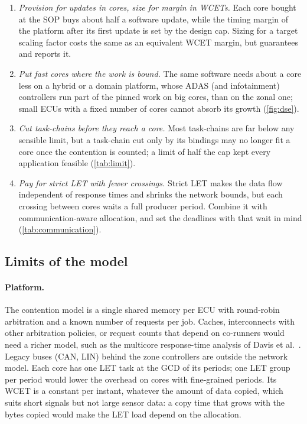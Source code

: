 \begin{enumerate}[label=\textbf{R\arabic*.}, leftmargin=2em]
the cores needed grow with the cores used; a WCET measured in isolation
underestimates the platform by up to half here.
\item \emph{Provision for updates in cores, size for margin in WCETs.}
Each core bought at the SOP buys about half a software update, while the
timing margin of the platform after its first update is set by the design
cap. Sizing for a target scaling factor costs the same as an equivalent
WCET margin, but guarantees and reports it.
\item \emph{Put fast cores where the work is bound.} The same software
needs about a core less on a hybrid or a domain platform, whose ADAS (and
infotainment) controllers run part of the pinned work on big cores, than
on the zonal one; small ECUs with a fixed number of cores cannot absorb
its growth (\cref{fig:dse}).
\item \emph{Cut task-chains before they reach a core.} Most task-chains
are far below any sensible limit, but a task-chain cut only by its
bindings may no longer fit a core once the contention is counted; a limit
of half the cap kept every application feasible (\cref{tab:limit}).
\item \emph{Pay for strict LET with fewer crossings.} Strict LET makes the
data flow independent of response times and shrinks the network bounds,
but each crossing between cores waits a full producer period. Combine it
with communication-aware allocation, and set the deadlines with that wait
in mind (\cref{tab:communication}).
\end{enumerate}

\subsection{Limits of the model}

\paragraph{Platform.} The contention model is a single shared memory per
ECU with round-robin arbitration and a known number of requests per job.
Caches, interconnects with other arbitration policies, or request counts
that depend on co-runners would need a richer model, such as the
multicore response-time analysis of Davis et al.\
\cite{davis2018extensible}. Legacy buses (CAN, LIN) behind the zone
controllers are outside the network model. Each core has one LET task at
the GCD of its periods; one LET group per period would lower the overhead
on cores with fine-grained periods. Its WCET is a constant per instant,
whatever the amount of data copied, which suits short signals but not
large sensor data: a copy time that grows with the bytes copied would
make the LET load depend on the allocation.

